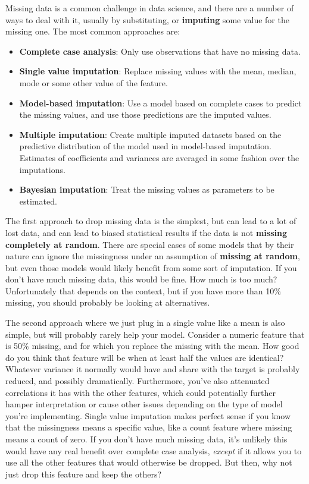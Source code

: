 \documentclass[
  letterpaper,
]{krantz}
\providecommand{\tightlist}{%
  \setlength{\itemsep}{0pt}\setlength{\parskip}{0pt}}\usepackage{longtable,booktabs,array}
\begin{document}
Missing data is a common challenge in data science, and there are a
number of ways to deal with it, usually by substituting, or
\textbf{imputing} some value for the missing one. The most common
approaches are:

\begin{itemize}
\tightlist
\item
  \textbf{Complete case analysis}: Only use observations that have no
  missing data.
\item
  \textbf{Single value imputation}: Replace missing values with the
  mean, median, mode or some other value of the feature.
\item
  \textbf{Model-based imputation}: Use a model based on complete cases
  to predict the missing values, and use those predictions are the
  imputed values.
\item
  \textbf{Multiple imputation}: Create multiple imputed datasets based
  on the predictive distribution of the model used in model-based
  imputation. Estimates of coefficients and variances are averaged in
  some fashion over the imputations.
\item
  \textbf{Bayesian imputation}: Treat the missing values as parameters
  to be estimated.
\end{itemize}

The first approach to drop missing data is the simplest, but can lead to
a lot of lost data, and can lead to biased statistical results if the
data is not \textbf{missing completely at random}. There are special
cases of some models that by their nature can ignore the missingness
under an assumption of \textbf{missing at random}, but even those models
would likely benefit from some sort of imputation. If you don't have
much missing data, this would be fine. How much is too much?
Unfortunately that depends on the context, but if you have more than
10\% missing, you should probably be looking at alternatives.

The second approach where we just plug in a single value like a mean is
also simple, but will probably rarely help your model. Consider a
numeric feature that is 50\% missing, and for which you replace the
missing with the mean. How good do you think that feature will be when
at least half the values are identical? Whatever variance it normally
would have and share with the target is probably reduced, and possibly
dramatically. Furthermore, you've also attenuated correlations it has
with the other features, which could potentially further hamper
interpretation or cause other issues depending on the type of model
you're implementing. Single value imputation makes perfect sense if you
know that the missingness means a specific value, like a count feature
where missing means a count of zero. If you don't have much missing
data, it's unlikely this would have any real benefit over complete case
analysis, \emph{except} if it allows you to use all the other features
that would otherwise be dropped. But then, why not just drop this
feature and keep the others?
\end{document}
